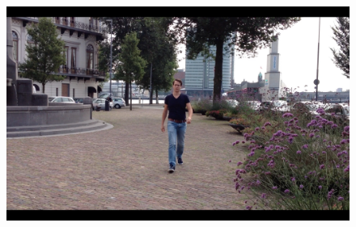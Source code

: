 \begin{figure}
\centering
  \includegraphics[width=1\textwidth]{./Figures/chapter6/data_collection/stills/roemer walk.png}
  \caption[]{}
\end{figure}